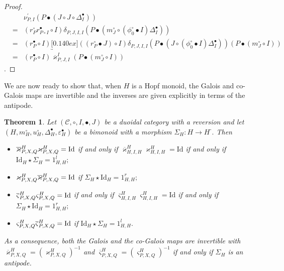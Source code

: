 \documentclass[nosumlimits,twoside]{amsart}
\newtheorem{theorem}{\sc Theorem}[section]
\theoremstyle{definition}
\theoremstyle{remark}
\def\revsn{\text{-}}
\newenvironment{invisible}{{\noindent\sc \colorbox{yellow}{Invisible:}\;}\color{gray}}{\medskip}
\newcommand{\rd}[1]{{\color{red}{#1}}}
\begin{document}
\begin{proof}
\begin{invisible}
\begin{eqnarray*}
&&\nu _{P,I}^{\prime }\left( P\bullet \left( J\circ J\circ \Delta
_{I}^{\bullet }\right) \right)  \\
&=&\left( r_{P}^{\circ }r_{P\circ I}^{\bullet }\circ I\right) \delta
_{P,J,I,I}\left( P\bullet \left( m_{J}^{\circ }\circ \left( \phi _{0}^{\circ
}\bullet I\right) \Delta _{I}^{\bullet }\right) \right)  \\
&=&\left( r_{P}^{\bullet }\circ I\right) \underbracket[0.140ex]{\left(
\left( r_{P}^{\circ }\bullet J\right) \circ I\right) \delta _{P,J,I,I}\left(
P\bullet \left( J\circ \left( \phi^\circ_0\bullet I\right) \Delta
_{I}^{\bullet }\right) \right) }\left( P\bullet \left( m_{J}^{\circ }\circ
I\right) \right)  \\
&=&\left( r_{P}^{\bullet }\circ I\right) \overline{\varkappa }%
_{P,J,I}^{I}\left( P\bullet \left( m_{J}^{\circ }\circ I\right) \right)
\end{eqnarray*}.
\end{invisible}    
\end{proof}

We are now ready to show that, when $H$ is a Hopf monoid, the Galois and co-Galois maps are invertible and the inverses are given explicitly in terms of the antipode.

\begin{theorem}%
\label{thm:Galinv} Let $\left( \mathcal{C},\circ ,I,\bullet ,J\right) $ be a
duoidal category with a reversion and let $\left( H,m_{H}^{\circ
},u_{H}^{\circ },\Delta _{H}^{\bullet },\varepsilon _{H}^{\bullet }\right) $
be a bimonoid with a morphism $\Sigma _{H}:H\rightarrow H^\revsn.$ Then

\begin{itemize}
\item[$1)$] $\overline{\varkappa }_{P,X,Q}^{H}\varkappa _{P,X,Q}^{H}=\mathrm{%
Id}$ if and only if $\overline{\varkappa }_{H,I,H}^{H}\varkappa _{H,I,H}^{H}=%
\mathrm{Id}$ if and only if $\mathrm{Id}_{H}\star \Sigma _{H}=1_{H,H}^{l};$

\item[$2)$] $\varkappa _{P,X,Q}^{H}\overline{\varkappa }_{P,X,Q}^{H}=\mathrm{%
Id}$ if $\Sigma _{H}\star \mathrm{Id}_{H}=1_{H,H}^{r};$

\item[$3)$] $\overline{\varsigma }_{P,X,Q}^{H}\varsigma _{P,X,Q}^{H}=\mathrm{%
Id}$  if and only if $\overline{\varsigma }_{H,I,H}^{H}\varsigma
_{H,I,H}^{H}=\mathrm{Id}$ if and only if $\Sigma _{H}\star \mathrm{Id}%
_{H}=1_{H,H}^{r};$

\item[$4)$] $\varsigma _{P,X,Q}^{H}\overline{\varsigma }_{P,X,Q}^{H}=\mathrm{%
Id}$ if $\mathrm{Id}_{H}\star \Sigma _{H}=1_{H,H}^{l}.$
\end{itemize}

As a consequence, both the Galois and the co-Galois maps are invertible with
$\overline{\varkappa }_{P,X,Q}^{H}=\left( \varkappa _{P,X,Q}^{H}\right) ^{-1}
$ and $\overline{\varsigma }_{P,X,Q}^{H}=\left( \varsigma
_{P,X,Q}^{H}\right) ^{-1}$ if and only if $\Sigma _{H}$ is an antipode.
\end{theorem}
\end{document}
